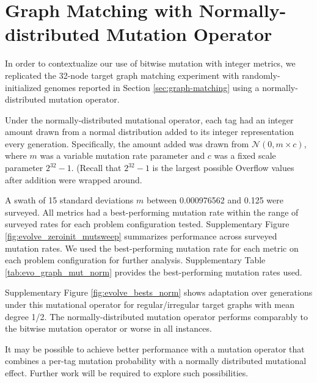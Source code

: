 \section{Graph Matching with Normally-distributed Mutation Operator}
\label{sec:graph-matching-norm}

In order to contextualize our use of bitwise mutation with integer metrics, we replicated the 32-node target graph matching experiment with randomly-initialized genomes reported in Section \ref{sec:graph-matching} using a normally-distributed mutation operator.

Under the normally-distributed mutational operator, each tag had an integer amount drawn from a normal distribution added to its integer representation every generation.
Specifically, the amount added was drawn from $\mathcal{N}(0, m \times c)$, where $m$ was a variable mutation rate parameter and $c$ was a fixed scale parameter $2^{32} - 1$.
(Recall that $2^{32} - 1$ is the largest possible
Overflow values after addition were wrapped around.

A swath of 15 standard deviations $m$ between 0.000976562 and 0.125 were surveyed.
All metrics had a best-performing mutation rate within the range of surveyed rates for each problem configuration tested.
Supplementary Figure \ref{fig:evolve_zeroinit_mutsweep} summarizes performance across surveyed mutation rates.
We used the best-performing mutation rate for each metric on each problem configuration for further analysis.
Supplementary Table \ref{tab:evo_graph_mut_norm} provides the best-performing mutation rates used.

Supplementary Figure \ref{fig:evolve_bests_norm} shows adaptation over generations under this mutational operator for regular/irregular target graphs with mean degree 1/2.
The normally-distributed mutation operator performs comparably to the bitwise mutation operator or worse in all instances.

It may be possible to achieve better performance with a mutation operator that combines a per-tag mutation probability with a normally distributed mutational effect.
Further work will be required to explore such possibilities.
